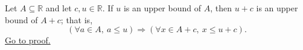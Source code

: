 \begin{proposition}
\label{prop:translation-preserves-upper-bounds}
Let $A\subseteq\mathbb{R}$ and let $c,u\in\mathbb{R}$.  If $u$ is an
upper bound of $A$, then $u+c$ is an upper bound of $A+c$; that is,
\[
\left(\forall a\in A,\ a\leq u\right)
\Longrightarrow
\left(\forall x\in A+c,\ x\leq u+c\right).
\]
\hyperref[prf:translation-preserves-upper-bounds]{Go to proof.}
\end{proposition}
